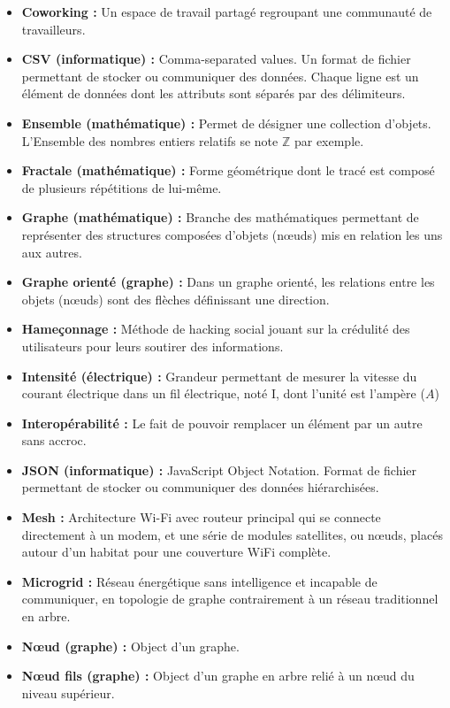 \begin{itemize}
    \item \textbf{Coworking :} Un espace de travail partagé regroupant une communauté de travailleurs.
    \item \textbf{CSV (informatique) :} Comma-separated values. Un format de fichier permettant de stocker ou communiquer des données.
Chaque ligne est un élément de données dont les attributs sont séparés par des délimiteurs.
    \item \textbf{Ensemble (mathématique) :} Permet de désigner une collection d'objets.\\ L'Ensemble des nombres entiers relatifs se note $\mathbb{Z}$ par exemple.
    \item \textbf{Fractale (mathématique) :} Forme géométrique dont le tracé est composé de plusieurs répétitions de lui-même.
    \item \textbf{Graphe (mathématique) :} Branche des mathématiques permettant de représenter des structures composées d'objets (nœuds) mis en relation les uns aux autres.
    \item \textbf{Graphe orienté (graphe) :} Dans un graphe orienté, les relations entre les objets (nœuds) sont des flèches définissant une direction.
    \item \textbf{Hameçonnage :} Méthode de hacking social jouant sur la crédulité des utilisateurs pour leurs soutirer des informations.
    \item \textbf{Intensité (électrique) :} Grandeur permettant de mesurer la vitesse du courant électrique dans un fil électrique, noté I, dont l'unité est l'ampère ($A$)
    \item \textbf{Interopérabilité :} Le fait de pouvoir remplacer un élément par un autre sans accroc.
    \item \textbf{JSON (informatique) :} JavaScript Object Notation. Format de fichier permettant de stocker ou communiquer des données hiérarchisées.
    \item \textbf{Mesh :} Architecture Wi-Fi avec routeur principal qui se connecte directement à un modem, et une série de modules satellites, ou nœuds, placés autour d'un habitat pour une couverture WiFi complète.
    \item \textbf{Microgrid :} Réseau énergétique sans intelligence et incapable de communiquer, en topologie de graphe contrairement à un réseau traditionnel en arbre.
    \item \textbf{Nœud (graphe) :} Object d'un graphe.
    \item \textbf{Nœud fils (graphe) :} Object d'un graphe en arbre relié à un nœud du niveau supérieur.

\end{itemize}
